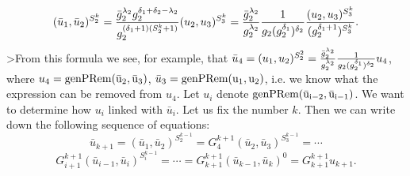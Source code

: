 \documentclass[12pt,fullpage]{article}
\newcommand{\genPRem}{\rm genPRem}
\begin{document}
\begin{equation}
(\bar u_1,\bar u_2)^{S_2^k}=
{ {{{\bar g}_2}^{\lambda_2}g_2^{\delta_1+\delta_2-\lambda_2}} \over
{g_2^{(\delta_1+1)(S_2^k+1)}}}(u_2,u_3)^{S_3^k}=
  {{{\bar g}_2}^{\lambda_2}\over
  {g_2^{\lambda_2}}}{1\over{g_2 (g_2^{\delta_1})^{\delta_2}}}
  {(u_2,u_3)^{S_3^k}\over{(g_2^{\delta_1+1})^{S_3^k}}}.\label{transformation}
\end{equation}
>From this formula we see, for example, that $\bar u_4=(u_1,u_2)^{S_2^2}=
  {{{\bar g}_2}^{\lambda_2}\over
  {g_2^{\lambda_2}}}{1\over{g_2 (g_2^{\delta_1})^{\delta_2}}}
  {u_4}$, where $u_4=\genPRem(\bar u_2,\bar u_3)$, $\bar u_3=\genPRem(u_1,u_2)$,
i.e. we know what the expression can be removed from $u_4$.
Let $u_i$ denote $\genPRem(\bar u_{i-2},\bar u_{i-1})$.
We want to determine how $u_i$ linked with $\bar u_i$. Let us fix the
number $k$. Then we can write down the following sequence of equations:
$$
\bar u_{k+1}=(\bar u_1,\bar u_2)^{S_2^{k-1}}=G_4^{k+1}(\bar u_2,\bar u_3)^{S_3^{k-1}}=\cdots
$$
$$
G_{i+1}^{k+1}(\bar u_{i-1},\bar u_i)^{S_i^{k-1}}=\cdots=
G_{k+1}^{k+1}(\bar u_{k-1},\bar u_k)^0=G_{k+1}^{k+1}u_{k+1}.
$$
\end{document}
